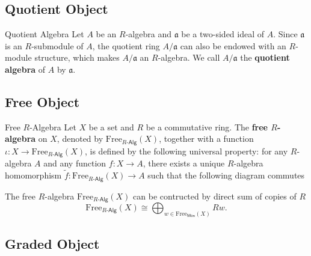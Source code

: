 \subsection{Quotient Object}

\begin{definition}{Quotient Algebra}{}
    Let $A$ be an $R$-algebra and $\mathfrak{a}$ be a two-sided ideal of $A$. Since $\mathfrak{a}$ is an $R$-submodule of $A$, the quotient ring $A/\mathfrak{a}$ can also be endowed with an $R$-module structure, which makes $A/\mathfrak{a}$ an $R$-algebra. We call $A/\mathfrak{a}$ the \textbf{quotient algebra} of $A$ by $\mathfrak{a}$.
\end{definition}


\subsection{Free Object}
\begin{definition}{Free $R$-Algebra}{}
    Let $X$ be a set and $R$ be a commutative ring. The \textbf{free $R$-algebra} on $X$, denoted by $\mathrm{Free}_{R\text{-}\mathsf{Alg}}(X)$, together with a function $\iota:X\to \mathrm{Free}_{R\text{-}\mathsf{Alg}}(X)$, is defined by the following universal property: for any $R$-algebra $A$ and any function $f:X\to A$, there exists a unique $R$-algebra homomorphism $\widetilde{f}:\mathrm{Free}_{R\text{-}\mathsf{Alg}}(X)\to A$ such that the following diagram commutes
    \begin{center}
    \end{center}
    The free $R$-algebra $\mathrm{Free}_{R\text{-}\mathsf{Alg}}(X)$ can be contructed by direct sum of copies of $R$
    \[
        \mathrm{Free}_{R\text{-}\mathsf{Alg}}(X)\cong\bigoplus_{w\in\mathrm{Free}_{\mathsf{Mon}}(X)}Rw.  
    \]
\end{definition}


\subsection{Graded Object}

